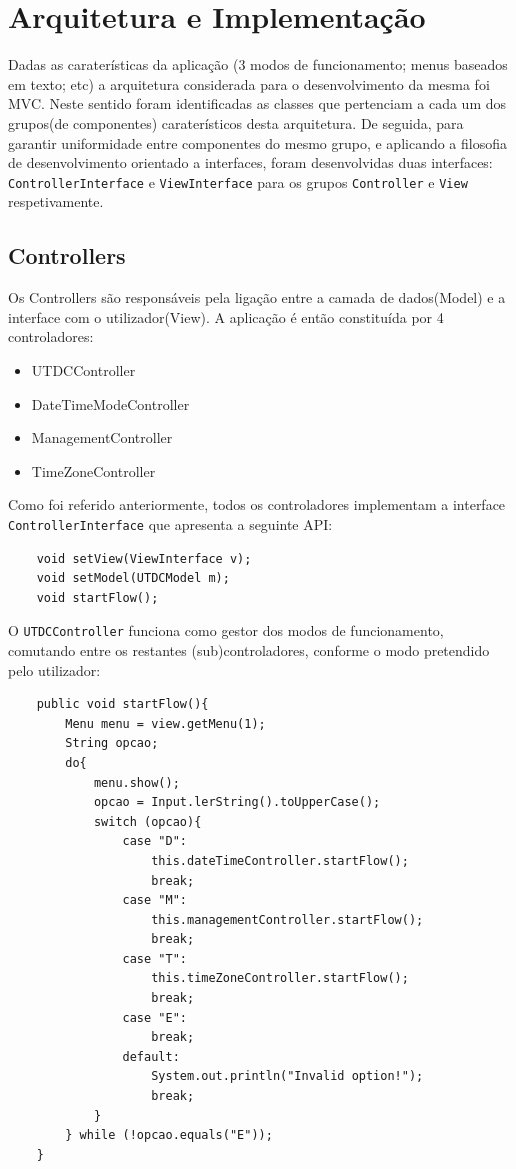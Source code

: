 \documentclass{article}
\begin{document}
\newpage

\section{Arquitetura e Implementação}
Dadas as caraterísticas da aplicação (3 modos de funcionamento; menus baseados em texto; etc) a arquitetura considerada para o desenvolvimento da mesma foi MVC. 
Neste sentido foram identificadas as classes que pertenciam a cada um dos grupos(de componentes) caraterísticos desta arquitetura.
De seguida, para garantir uniformidade entre componentes do mesmo grupo, e aplicando a filosofia de desenvolvimento orientado a interfaces, foram desenvolvidas duas interfaces: \texttt{ControllerInterface} e \texttt{ViewInterface} para os grupos \texttt{Controller} e \texttt{View} respetivamente.

\subsection{Controllers}
Os Controllers são responsáveis pela ligação entre a camada de dados(Model) e a interface com o utilizador(View). 
A aplicação é então constituída por 4 controladores:
\begin{itemize}
    \item UTDCController
    \item DateTimeModeController
    \item ManagementController
    \item TimeZoneController
\end{itemize}
Como foi referido anteriormente, todos os controladores implementam a interface \texttt{ControllerInterface} que apresenta a seguinte API:
\begin{verbatim}
    void setView(ViewInterface v);
    void setModel(UTDCModel m);
    void startFlow(); 
\end{verbatim}

O \texttt{UTDCController} funciona como gestor dos modos de funcionamento, comutando entre os restantes (sub)controladores, conforme o 
modo pretendido pelo utilizador:

\begin{verbatim}
    public void startFlow(){
        Menu menu = view.getMenu(1);
        String opcao;
        do{
            menu.show();
            opcao = Input.lerString().toUpperCase();
            switch (opcao){
                case "D":
                    this.dateTimeController.startFlow();
                    break;
                case "M":
                    this.managementController.startFlow();
                    break;
                case "T":
                    this.timeZoneController.startFlow();
                    break;
                case "E":
                    break;
                default:
                    System.out.println("Invalid option!");
                    break;
            }
        } while (!opcao.equals("E"));
    }
\end{verbatim}
\end{document}
